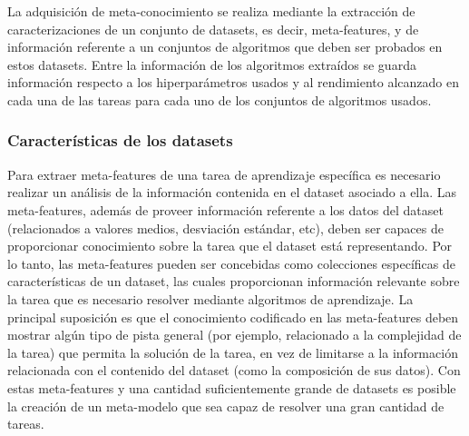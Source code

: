 
La adquisición de meta-conocimiento se realiza mediante la extracción de caracterizaciones de un conjunto de datasets, es decir, meta-features, y de información referente a un conjuntos de algoritmos que deben ser probados en estos datasets. Entre la información de los algoritmos extraídos se guarda información respecto a los hiperparámetros usados y al rendimiento alcanzado en cada una de las tareas para cada uno de los conjuntos de algoritmos usados.

\subsubsection{Características de los datasets}\label{subsub:metafeat}

Para extraer meta-features de una tarea de aprendizaje específica es necesario realizar un análisis de la información contenida en el dataset asociado a ella. Las meta-features, además de proveer información referente a los datos del dataset (relacionados a valores medios, desviación estándar, etc), deben ser capaces de proporcionar conocimiento sobre la tarea que el dataset está representando.  Por lo tanto, las meta-features pueden ser concebidas como colecciones específicas de características de un dataset, las cuales proporcionan información relevante sobre la tarea que es necesario resolver mediante algoritmos de aprendizaje. La principal suposición es que el conocimiento codificado en las meta-features deben mostrar algún tipo de pista general (por ejemplo, relacionado a la complejidad de la tarea) que permita la solución de la tarea, en vez de limitarse a la información relacionada con el contenido del dataset (como la composición de sus datos). Con estas meta-features y una cantidad suficientemente grande de datasets es posible la creación de un meta-modelo que sea capaz de resolver una gran cantidad de tareas.

